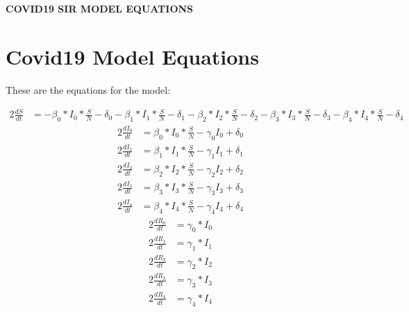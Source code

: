 \documentclass{article}%
\begin{document}
%
\normalsize%
\begin{center}%
\section*{}%
\label{sec:}%
\begin{Large}%
\textbf{COVID19 SIR MODEL EQUATIONS}%
\end{Large}

%
\end{center}%
\section{Covid19 Model Equations}%
\label{sec:Covid19ModelEquations}%
\begin{large}%
These are the equations for the model:%
\end{large}

%
\begin{alignat}{2}%
\frac{dS}{dt} &= -\beta_{0}*I_{0} * \frac{S}{N}- \delta_{0} -\beta_{1}*I_{1} * \frac{S}{N}- \delta_{1} -\beta_{2}*I_{2} * \frac{S}{N}- \delta_{2} -\beta_{3}*I_{3} * \frac{S}{N}- \delta_{3} -\beta_{4}*I_{4} * \frac{S}{N}- \delta_{4}%
\end{alignat}%
\begin{alignat}{2}%
\frac{dI_{0}}{dt} &= \beta_{0}*I_{0} * \frac{S}{N} -\gamma_{0}I_{0}+ \delta_{0}%
\end{alignat}%
\begin{alignat}{2}%
\frac{dI_{1}}{dt} &= \beta_{1}*I_{1} * \frac{S}{N} -\gamma_{1}I_{1}+ \delta_{1}%
\end{alignat}%
\begin{alignat}{2}%
\frac{dI_{2}}{dt} &= \beta_{2}*I_{2} * \frac{S}{N} -\gamma_{2}I_{2}+ \delta_{2}%
\end{alignat}%
\begin{alignat}{2}%
\frac{dI_{3}}{dt} &= \beta_{3}*I_{3} * \frac{S}{N} -\gamma_{3}I_{3}+ \delta_{3}%
\end{alignat}%
\begin{alignat}{2}%
\frac{dI_{4}}{dt} &= \beta_{4}*I_{4} * \frac{S}{N} -\gamma_{4}I_{4}+ \delta_{4}%
\end{alignat}%
\begin{alignat}{2}%
\frac{dR_{0}}{dt} &= \gamma_{0}*I_{0}%
\end{alignat}%
\begin{alignat}{2}%
\frac{dR_{1}}{dt} &= \gamma_{1}*I_{1}%
\end{alignat}%
\begin{alignat}{2}%
\frac{dR_{2}}{dt} &= \gamma_{2}*I_{2}%
\end{alignat}%
\begin{alignat}{2}%
\frac{dR_{3}}{dt} &= \gamma_{3}*I_{3}%
\end{alignat}%
\begin{alignat}{2}%
\frac{dR_{4}}{dt} &= \gamma_{4}*I_{4}%
\end{alignat}%
\end{document}
